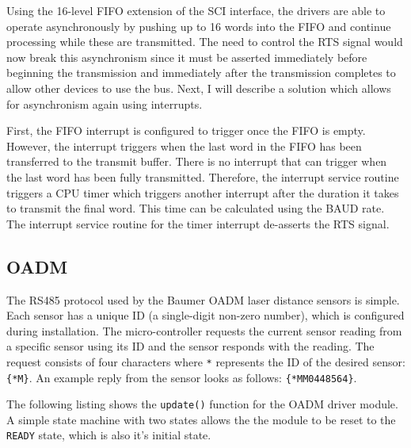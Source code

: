 Using the 16-level FIFO extension of the SCI interface, the drivers are able to operate asynchronously by pushing up to 16 words into the FIFO and continue processing while these are transmitted. The need to control the RTS signal would now break this asynchronism since it must be asserted immediately before beginning the transmission and immediately after the transmission completes to allow other devices to use the bus. Next, I will describe a solution which allows for asynchronism again using interrupts.

First, the FIFO interrupt is configured to trigger once the FIFO is empty. However, the interrupt triggers when the last word in the FIFO has been transferred to the transmit buffer. There is no interrupt that can trigger when the last word has been fully transmitted. Therefore, the interrupt service routine triggers a CPU timer which triggers another interrupt after the duration it takes to transmit the final word. This time can be calculated using the BAUD rate. The interrupt service routine for the timer interrupt de-asserts the RTS signal.

\subsection{OADM}

The RS485 protocol used by the Baumer OADM laser distance sensors is simple. Each sensor has a unique ID (a single-digit non-zero number), which is configured during installation. The micro-controller requests the current sensor reading from a specific sensor using its ID and the sensor responds with the reading. The request consists of four characters where \texttt{*} represents the ID of the desired sensor: \texttt{\{*M\}}. An example reply from the sensor looks as follows: \texttt{\{*MM0448564\}}.

The following listing shows the \texttt{update()} function for the OADM driver module. A simple state machine with two states allows the the module to be reset to the \texttt{READY} state, which is also it's initial state.

